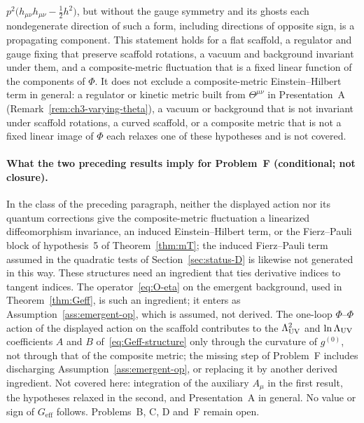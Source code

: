 \(p^2\bigl(h_{\mu\nu}h_{\mu\nu}-\tfrac12h^2\bigr)\), but without the
gauge symmetry and its ghosts each nondegenerate direction of such a
form, including directions of opposite sign, is a propagating
component. This statement holds for a flat scaffold, a regulator and
gauge fixing that preserve scaffold rotations, a vacuum and background
invariant under them, and a composite-metric fluctuation that is a
fixed linear function of the components of \(\Phi\). It does not
exclude a composite-metric Einstein--Hilbert term in general: a
regulator or kinetic metric built from \(\Theta^{\mu\nu}\) in
Presentation~A (Remark~\ref{rem:ch3-varying-theta}), a vacuum or
background that is not invariant under scaffold rotations, a curved
scaffold, or a composite metric that is not a fixed linear image of
\(\Phi\) each relaxes one of these hypotheses and is not covered.

\paragraph{What the two preceding results imply for Problem~F (conditional; not closure).}
In the class of the preceding paragraph, neither the displayed action
nor its quantum corrections give the composite-metric fluctuation a
linearized diffeomorphism invariance, an induced Einstein--Hilbert
term, or the Fierz--Pauli block of hypothesis~5 of
Theorem~\ref{thm:mT}; the induced Fierz--Pauli term assumed in the
quadratic tests of Section~\ref{sec:status-D} is likewise not
generated in this way. These structures need an ingredient that ties
derivative indices to tangent indices. The
operator~\eqref{eq:O-eta} on the emergent background, used in
Theorem~\ref{thm:Geff}, is such an ingredient; it enters as
Assumption~\ref{ass:emergent-op}, which is assumed, not derived. The
one-loop \(\Phi\)--\(\Phi\) action of the displayed action on the
scaffold contributes to the \(\Lambda_{\mathrm{UV}}^2\) and \(\ln\Lambda_{\mathrm{UV}}\) coefficients
\(A\) and \(B\) of~\eqref{eq:Geff-structure} only through the curvature
of \(g^{(0)}\), not through that of the composite metric; the missing
step of Problem~F includes discharging
Assumption~\ref{ass:emergent-op}, or replacing it by another derived
ingredient. Not covered here: integration of the auxiliary \(A_\mu\) in
the first result, the hypotheses relaxed in the second, and
Presentation~A in general. No value or sign of \(G_{\mathrm{eff}}\)
follows. Problems~B, C, D and~F remain open.

